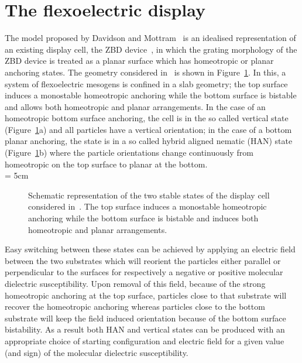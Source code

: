 

\section{The flexoelectric display}

The model proposed by Davidson and Mottram~\cite{DavidsonMottram02} is an idealised 
representation of an existing display cell, the ZBD device~\cite{ZBD}, in which the grating 
morphology of the ZBD device is treated as a planar surface which has homeotropic or planar 
anchoring states. The geometry
considered in~\cite{DavidsonMottram02} is shown in Figure~\ref{fig:bistDisplay}.
In this, a system of flexoelectric mesogens is confined in a slab geometry; 
the top surface induces a monostable homeotropic anchoring while the bottom surface is
bistable and allows both homeotropic and planar arrangements. In the case of an 
homeotropic bottom surface anchoring, the cell is in the so called
vertical state (Figure~\ref{fig:bistDisplay}a) and all particles have a vertical orientation; 
in the case of a bottom planar anchoring, the state is in a so called hybrid aligned 
nematic (HAN) state (Figure~\ref{fig:bistDisplay}b) where the particle
orientations change continuously from homeotropic on the top surface to planar at the bottom.\\

\picW = 5cm
\begin{figure}
	\centering
	\hspace*{10mm}
	\caption{Schematic representation of the two stable states of the 
	display cell considered in~\cite{DavidsonMottram02}. The top surface induces a
	monostable homeotropic anchoring while the bottom surface is bistable and induces 
	both homeotropic and planar arrangements. }
	\label{fig:bistDisplay}
\end{figure}

Easy switching between these states can be achieved by applying an electric field between the two
substrates which will reorient the particles either parallel or perpendicular to the 
surfaces for respectively a negative or positive molecular dielectric susceptibility. 
Upon removal of this field, because of the strong homeotropic anchoring at the top
surface, particles close to that substrate will recover the homeotropic anchoring whereas 
particles close to the bottom substrate will keep the field induced orientation because of the
bottom surface bistability. As a result both HAN and vertical states can be produced with an
appropriate choice of starting configuration and electric field for a given value (and sign) of
the molecular dielectric susceptibility.\\

